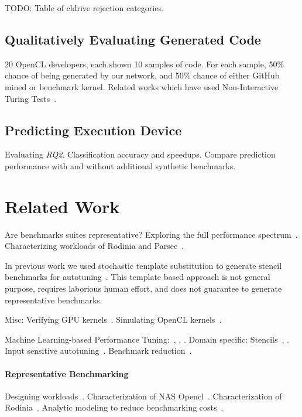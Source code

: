 \documentclass[preprint,nonatbib,10pt,nocopyrightspace]{sigplanconf}
\begin{document}
TODO: Table of cldrive rejection categories.


\subsection{Qualitatively Evaluating Generated Code}\label{subsec:}

20 OpenCL developers, each shown 10 samples of code. For each sample,
50\% chance of being generated by our network, and 50\% chance of
either GitHub mined or benchmark kernel. Related works which have used
Non-Interactive Turing Tests~\cite{Gao2015a,Zhang2016}.


\subsection{Predicting Execution Device}\label{subsec:}

Evaluating \emph{RQ2}. Classification accuracy and speedups. Compare
prediction performance with and without additional synthetic
benchmarks.


\section{Related Work}\label{sec:related-work}

Are benchmarks suites representative? Exploring the full performance
spectrum~\cite{Ryoo2015}. Characterizing workloads of Rodinia and
Parsec~\cite{Che2010}.

In previous work we used stochastic template substitution to generate
stencil benchmarks for autotuning~\cite{Cummins2015a}. This template
based approach is not general purpose, requires laborious human
effort, and does not guarantee to generate representative benchmarks.

Misc: Verifying GPU kernels~\cite{Betts2012}. Simulating OpenCL
kernels~\cite{Price2015}.

Machine Learning-based Performance Tuning:~\cite{Wen2015},
\cite{Magni2014}, \cite{Falch2015}. Domain specific:
Stencils~\cite{Garvey2015b}, \cite{Cummins2015a}. Input sensitive
autotuning~\cite{Ding2015}. Benchmark reduction~\cite{Castro2014}.


\paragraph{Representative Benchmarking} Designing
workloads~\cite{Eeckhout2002}. Characterization of NAS
Opencl~\cite{Seo2011}. Characterization of
Rodinia~\cite{Che2010,Ryoo2015}. Analytic modeling to reduce
benchmarking costs~\cite{Kalibera2013}.
\end{document}
